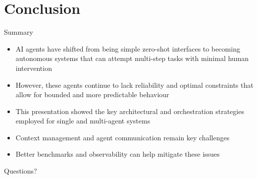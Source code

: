\documentclass[10pt]{beamer}
\begin{document}
\section{Conclusion}
\begin{frame}{Summary}
	\begin{itemize}
		\item AI agents have shifted from being simple zero-shot interfaces to becoming autonomous
			systems that can attempt multi-step tasks with minimal human intervention
		\item However, these agents continue to lack reliability and optimal constraints that allow
			for bounded and more predictable behaviour
		\item This presentation showed the key architectural and orchestration strategies employed
			for single and multi-agent systems
		\item Context management and agent communication remain key challenges
		\item Better benchmarks and observability can help mitigate these issues
	\end{itemize}
\end{frame}

\begin{frame}[standout]
	Questions?
\end{frame}
\end{document}
